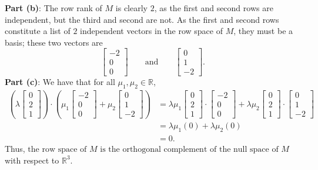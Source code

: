 \documentclass[11pt]{article}
\begin{document}
\textbf{Part (b)}: The row rank of $M$ is clearly $2$, as the first and second rows are independent, but the third and second are not. As the first and second rows constitute a list of $2$ independent vectors in the row space of $M$, they must be a basis; these two vectors are
\[
	\begin{bmatrix} -2 \\ 0 \\ 0 \end{bmatrix} \qquad \text{and} \qquad \begin{bmatrix} 0 \\ 1 \\ -2 \end{bmatrix}.
\]
\textbf{Part (c)}: We have that for all $\mu_{1}, \mu_{2} \in \mathbb{R}$,
\begin{align*}
	\left( \lambda \begin{bmatrix} 0 \\ 2 \\ 1 \end{bmatrix} \right) \cdot \left( \mu_{1} \begin{bmatrix} -2 \\ 0 \\ 0  \end{bmatrix} + \mu_{2} \begin{bmatrix} 0 \\ 1 \\ -2 \end{bmatrix} \right) &= \lambda \mu_{1} \begin{bmatrix} 0 \\ 2 \\ 1 \end{bmatrix} \cdot \begin{bmatrix} -2 \\ 0 \\ 0 \end{bmatrix} + \lambda \mu_{2} \begin{bmatrix} 0 \\ 2 \\ 1 \end{bmatrix} \cdot \begin{bmatrix} 0 \\ 1 \\ -2 \end{bmatrix} \\ 
	&= \lambda \mu_{1} (0) + \lambda \mu_{2} (0) \\
	&= 0.
\end{align*}
Thus, $\boxed{\text{the row space of $M$ is the orthogonal complement of the null space of $M$}}$ with respect to $\mathbb{R}^{3}$.

\end{document}
